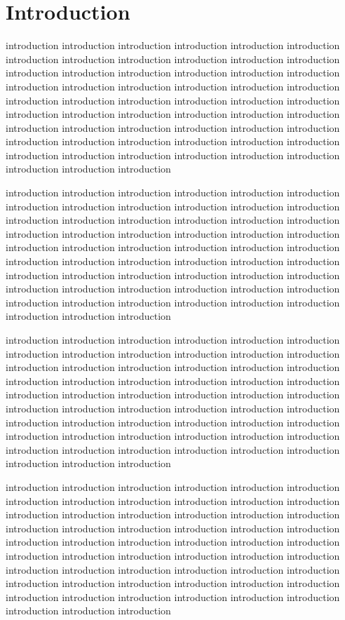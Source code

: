 \section{Introduction}

introduction introduction introduction introduction introduction introduction introduction introduction introduction introduction introduction introduction introduction introduction introduction introduction introduction introduction introduction introduction introduction introduction introduction introduction introduction introduction introduction introduction introduction introduction introduction introduction introduction introduction introduction introduction introduction introduction introduction introduction introduction introduction introduction introduction introduction introduction introduction introduction introduction introduction introduction introduction introduction introduction introduction introduction introduction

introduction introduction introduction introduction introduction introduction introduction introduction introduction introduction introduction introduction introduction introduction introduction introduction introduction introduction introduction introduction introduction introduction introduction introduction introduction introduction introduction introduction introduction introduction introduction introduction introduction introduction introduction introduction introduction introduction introduction introduction introduction introduction introduction introduction introduction introduction introduction introduction introduction introduction introduction introduction introduction introduction introduction introduction introduction

introduction introduction introduction introduction introduction introduction introduction introduction introduction introduction introduction introduction introduction introduction introduction introduction introduction introduction introduction introduction introduction introduction introduction introduction introduction introduction introduction introduction introduction introduction introduction introduction introduction introduction introduction introduction introduction introduction introduction introduction introduction introduction introduction introduction introduction introduction introduction introduction introduction introduction introduction introduction introduction introduction introduction introduction introduction

introduction introduction introduction introduction introduction introduction introduction introduction introduction introduction introduction introduction introduction introduction introduction introduction introduction introduction introduction introduction introduction introduction introduction introduction introduction introduction introduction introduction introduction introduction introduction introduction introduction introduction introduction introduction introduction introduction introduction introduction introduction introduction introduction introduction introduction introduction introduction introduction introduction introduction introduction introduction introduction introduction introduction introduction introduction

